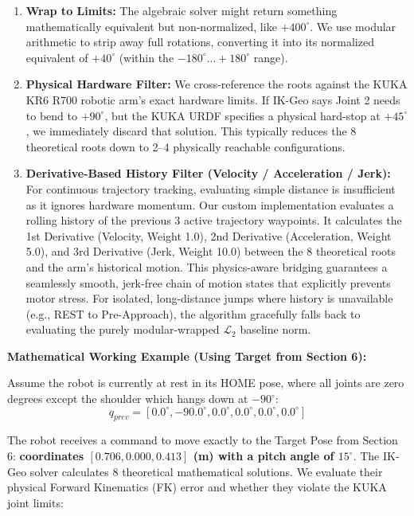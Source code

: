 \documentclass[11pt, a4paper]{article}
\begin{document}
\begin{enumerate}
    \item \textbf{Wrap to Limits:} The algebraic solver might return something mathematically equivalent but non-normalized, like $+400^\circ$. We use modular arithmetic to strip away full rotations, converting it into its normalized equivalent of $+40^\circ$ (within the $-180^\circ \dots +180^\circ$ range).
    \item \textbf{Physical Hardware Filter:} We cross-reference the roots against the KUKA KR6 R700 robotic arm's exact hardware limits. If IK-Geo says Joint 2 needs to bend to $+90^\circ$, but the KUKA URDF specifies a physical hard-stop at $+45^\circ$, we immediately discard that solution. This typically reduces the 8 theoretical roots down to 2–4 physically reachable configurations.
    \item \textbf{Derivative-Based History Filter (Velocity / Acceleration / Jerk):} For continuous trajectory tracking, evaluating simple distance is insufficient as it ignores hardware momentum. Our custom implementation evaluates a rolling history of the previous 3 active trajectory waypoints. It calculates the 1st Derivative (Velocity, Weight 1.0), 2nd Derivative (Acceleration, Weight 5.0), and 3rd Derivative (Jerk, Weight 10.0) between the 8 theoretical roots and the arm's historical motion. This physics-aware bridging guarantees a seamlessly smooth, jerk-free chain of motion states that explicitly prevents motor stress. For isolated, long-distance jumps where history is unavailable (e.g., REST to Pre-Approach), the algorithm gracefully falls back to evaluating the purely modular-wrapped $\mathcal{L}_2$ baseline norm.
\end{enumerate}

\vspace{0.2cm}
\vspace{0.2cm}
\textbf{Mathematical Working Example (Using Target from Section 6):}

Assume the robot is currently at rest in its HOME pose, where all joints are zero degrees except the shoulder which hangs down at $-90^\circ$:
\begin{equation*}
    q_{prev} = [0.0^\circ, -90.0^\circ, 0.0^\circ, 0.0^\circ, 0.0^\circ, 0.0^\circ]
\end{equation*}

The robot receives a command to move exactly to the Target Pose from Section 6: \textbf{coordinates $[0.706, 0.000, 0.413]$ (m) with a pitch angle of $15^\circ$}. The IK-Geo solver calculates 8 theoretical mathematical solutions. We evaluate their physical Forward Kinematics (FK) error and whether they violate the KUKA joint limits:
\end{document}
